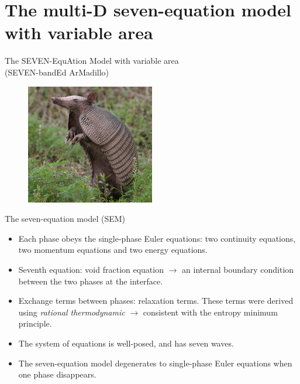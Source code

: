 \documentclass[xcolor=dvipsnames,10pt]{beamer}
\begin{document}
\section{The multi-D seven-equation model with variable area}
\begin{frame}
\begin{center}
The SEVEN-EquAtion Model with variable area\\
(SEVEN-bandEd ArMadillo)
\end{center}
\begin{figure}[H]
\centering
\includegraphics[width=0.5\textwidth]{../figures/seven_banded_armadillo.png}
\end{figure}   
\end{frame}
\begin{frame}{The seven-equation model (SEM)}
\begin{block}{}
\begin{itemize}
\setlength{\itemsep}{10pt}
\item Each phase obeys the single-phase Euler equations: two continuity equations, two momentum equations and two energy equations.
\item Seventh equation: void fraction equation $\rightarrow$ an internal boundary condition between the two phases at the interface.
\item Exchange terms between phases: relaxation terms. These terms were derived using \emph{rational thermodynamic} $\rightarrow$ consistent with the entropy minimum principle.
\item {\color{red}The system of equations is well-posed, and has seven waves.}
\item The seven-equation model degenerates to single-phase Euler equations when one phase disappears.
\end{itemize}
\end{block}
\end{frame}
\end{document}
